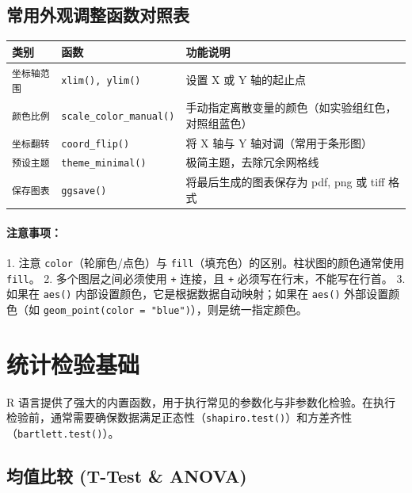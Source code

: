 \subsection{常用外观调整函数对照表}
\begin{table}[h!]
\centering
\renewcommand{\arraystretch}{1.5}
\begin{tabular}{|l|l|p{6cm}|}
\hline
\textbf{类别} & \textbf{函数} & \textbf{功能说明} \\ \hline
\texttt{坐标轴范围} & \texttt{xlim(), ylim()} & 设置 X 或 Y 轴的起止点 \\ \hline
\texttt{颜色比例} & \texttt{scale\_color\_manual()} & 手动指定离散变量的颜色（如实验组红色，对照组蓝色） \\ \hline
\texttt{坐标翻转} & \texttt{coord\_flip()} & 将 X 轴与 Y 轴对调（常用于条形图） \\ \hline
\texttt{预设主题} & \texttt{theme\_minimal()} & 极简主题，去除冗余网格线 \\ \hline
\texttt{保存图表} & \texttt{ggsave()} & 将最后生成的图表保存为 pdf, png 或 tiff 格式 \\ \hline
\end{tabular}
\end{table}

\paragraph{注意事项：}
1. 注意 \texttt{color}（轮廓色/点色）与 \texttt{fill}（填充色）的区别。柱状图的颜色通常使用 \texttt{fill}。
2. 多个图层之间必须使用 \texttt{+} 连接，且 \texttt{+} 必须写在行末，不能写在行首。
3. 如果在 \texttt{aes()} 内部设置颜色，它是根据数据自动映射；如果在 \texttt{aes()} 外部设置颜色（如 \texttt{geom\_point(color = "blue")}），则是统一指定颜色。



\section{统计检验基础}

R 语言提供了强大的内置函数，用于执行常见的参数化与非参数化检验。在执行检验前，通常需要确保数据满足正态性（\texttt{shapiro.test()}）和方差齐性（\texttt{bartlett.test()}）。

\subsection{均值比较 (T-Test \& ANOVA)}

